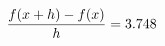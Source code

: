 \documentclass[preview]{standalone}
\begin{document}
\begin{align*}
\special{dvisvgm:raw <g id='unique000'>}\frac{f(x+h)-f(x)}{h} = 3.748\special{dvisvgm:raw </g>}
\end{align*}
\end{document}
